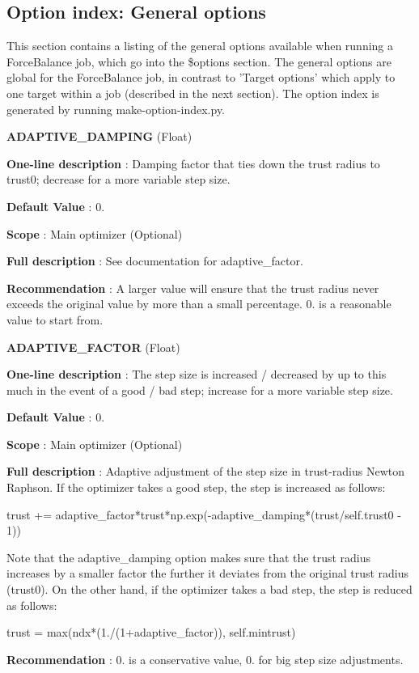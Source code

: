 \hypertarget{glossary_gen_option_index}{}\subsection{\-Option index\-: General options}\label{glossary_gen_option_index}
\-This section contains a listing of the general options available when running a \-Force\-Balance job, which go into the \$options section. \-The general options are global for the \-Force\-Balance job, in contrast to '\-Target options' which apply to one target within a job (described in the next section). \-The option index is generated by running make-\/option-\/index.\-py.

\begin{DoxyItemize}
\item {\bfseries  \-A\-D\-A\-P\-T\-I\-V\-E\-\_\-\-D\-A\-M\-P\-I\-N\-G } (\-Float) \par
{\bfseries  \-One-\/line description }\-: \-Damping factor that ties down the trust radius to trust0; decrease for a more variable step size. \par
{\bfseries  \-Default \-Value }\-: 0. \par
{\bfseries  \-Scope }\-: \-Main optimizer (\-Optional) \par
{\bfseries  \-Full description }\-: \-See documentation for adaptive\-\_\-factor. \par
{\bfseries  \-Recommendation }\-: \-A larger value will ensure that the trust radius never exceeds the original value by more than a small percentage. 0. is a reasonable value to start from.\end{DoxyItemize}
\begin{DoxyItemize}
\item {\bfseries  \-A\-D\-A\-P\-T\-I\-V\-E\-\_\-\-F\-A\-C\-T\-O\-R } (\-Float) \par
{\bfseries  \-One-\/line description }\-: \-The step size is increased / decreased by up to this much in the event of a good / bad step; increase for a more variable step size. \par
{\bfseries  \-Default \-Value }\-: 0. \par
{\bfseries  \-Scope }\-: \-Main optimizer (\-Optional) \par
{\bfseries  \-Full description }\-: \-Adaptive adjustment of the step size in trust-\/radius \-Newton \-Raphson. \-If the optimizer takes a good step, the step is increased as follows\-: \begin{DoxyVerb}
trust += adaptive_factor*trust*np.exp(-adaptive_damping*(trust/self.trust0 - 1))
\end{DoxyVerb}
 \-Note that the adaptive\-\_\-damping option makes sure that the trust radius increases by a smaller factor the further it deviates from the original trust radius (trust0). \-On the other hand, if the optimizer takes a bad step, the step is reduced as follows\-: \begin{DoxyVerb}
trust = max(ndx*(1./(1+adaptive_factor)), self.mintrust)
\end{DoxyVerb}
\end{DoxyItemize}
\par
{\bfseries  \-Recommendation }\-: 0. is a conservative value, 0. for big step size adjustments.

